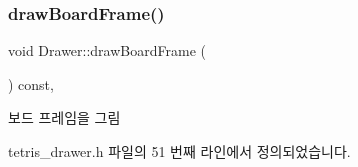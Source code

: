 \mbox{\label{class_drawer_a72d01f53fc2c5ff15763dcd76a9b9395}} 
\subsubsection{\texorpdfstring{draw\+Board\+Frame()}{drawBoardFrame()}}
{\footnotesize\ttfamily void Drawer\+::draw\+Board\+Frame (\begin{DoxyParamCaption}{ }\end{DoxyParamCaption}) const\hspace{0.3cm}{\ttfamily [inline]}, {\ttfamily [private]}}



보드 프레임을 그림 



tetris\+\_\+drawer.\+h 파일의 51 번째 라인에서 정의되었습니다.


